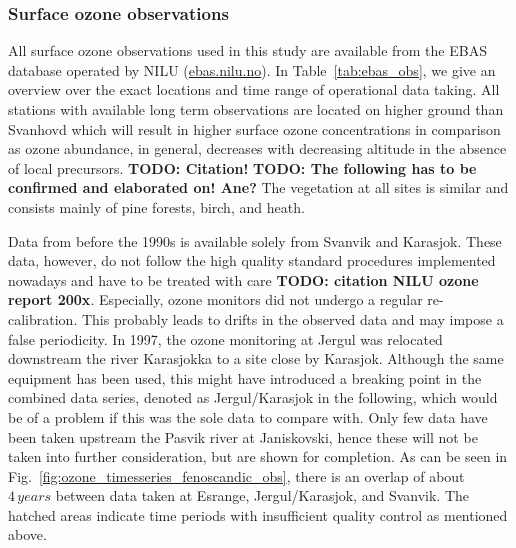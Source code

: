 \documentclass[bg, manuscript]{copernicus}
\begin{document}
\subsubsection{Surface ozone observations}
\label{subsubsec:ebas}
All surface ozone observations used in this study are available from the EBAS database operated by NILU (\href{http://ebas.nilu.no/}{ebas.nilu.no}). In Table~\ref{tab:ebas_obs}, we give an overview over the exact locations and time range of operational data taking. All stations with available long term observations are located on higher ground than Svanhovd which will result in higher surface ozone concentrations in comparison as ozone abundance, in general, decreases with decreasing altitude in the absence of local precursors. {\bf TODO: Citation!} {\bf TODO: The following has to be confirmed and elaborated on! Ane?} The vegetation at all sites is similar and consists mainly of pine forests, birch, and heath.

Data from before the 1990s is available solely from Svanvik and Karasjok. These data, however, do not follow the high quality standard procedures implemented nowadays and have to be treated with care {\bf TODO: citation NILU ozone report 200x}. Especially, ozone monitors did not undergo a regular re-calibration. This probably leads to drifts in the observed data and may impose a false periodicity. In 1997, the ozone monitoring at Jergul was relocated downstream the river Karasjokka to a site close by Karasjok. Although the same equipment has been used, this might have introduced a breaking point in the combined data series, denoted as Jergul/Karasjok in the following, which would be of a problem if this was the sole data to compare with. Only few data have been taken upstream the Pasvik river at Janiskovski, hence these will not be taken into further consideration, but are shown for completion. As can be seen in Fig.~\ref{fig:ozone_timesseries_fenoscandic_obs}, there is an overlap of about $4\,\unit{years}$ between data taken at Esrange, Jergul/Karasjok, and Svanvik. The hatched areas indicate time periods with insufficient quality control as mentioned above.
\end{document}
